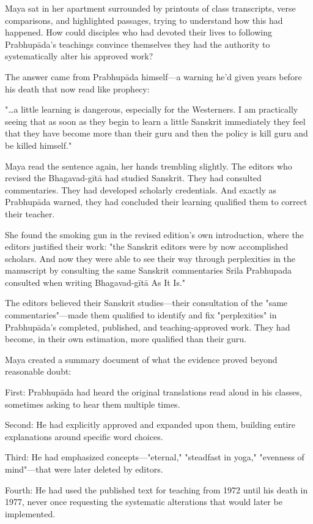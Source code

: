 \documentclass[12pt,twoside]{book}
\begin{document}
Maya sat in her apartment surrounded by printouts of class transcripts, verse comparisons, and highlighted passages, trying to understand how this had happened. How could disciples who had devoted their lives to following Prabhupāda's teachings convince themselves they had the authority to systematically alter his approved work?

The answer came from Prabhupāda himself—a warning he'd given years before his death that now read like prophecy:

"\ldots{}a little learning is dangerous, especially for the Westerners. I am practically seeing that as soon as they begin to learn a little Sanskrit immediately they feel that they have become more than their guru and then the policy is kill guru and be killed himself."

Maya read the sentence again, her hands trembling slightly. The editors who revised the Bhagavad-gītā had studied Sanskrit. They had consulted commentaries. They had developed scholarly credentials. And exactly as Prabhupāda warned, they had concluded their learning qualified them to correct their teacher.

She found the smoking gun in the revised edition's own introduction, where the editors justified their work: "the Sanskrit editors were by now accomplished scholars. And now they were able to see their way through perplexities in the manuscript by consulting the same Sanskrit commentaries Srila Prabhupada consulted when writing Bhagavad-gītā As It Is."

The editors believed their Sanskrit studies—their consultation of the "same commentaries"—made them qualified to identify and fix "perplexities" in Prabhupāda's completed, published, and teaching-approved work. They had become, in their own estimation, more qualified than their guru.

Maya created a summary document of what the evidence proved beyond reasonable doubt:

First: Prabhupāda had heard the original translations read aloud in his classes, sometimes asking to hear them multiple times.

Second: He had explicitly approved and expanded upon them, building entire explanations around specific word choices.

Third: He had emphasized concepts—"eternal," "steadfast in yoga," "evenness of mind"—that were later deleted by editors.

Fourth: He had used the published text for teaching from 1972 until his death in 1977, never once requesting the systematic alterations that would later be implemented.
\end{document}
